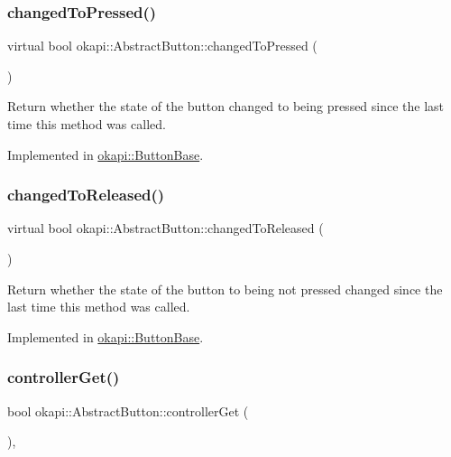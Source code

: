 \subsubsection{\texorpdfstring{changedToPressed()}{changedToPressed()}}
{\footnotesize\ttfamily virtual bool okapi\+::\+Abstract\+Button\+::changed\+To\+Pressed (\begin{DoxyParamCaption}{ }\end{DoxyParamCaption})\hspace{0.3cm}{\ttfamily [pure virtual]}}

Return whether the state of the button changed to being pressed since the last time this method was called. 

Implemented in \mbox{\hyperlink{classokapi_1_1ButtonBase_ac97e3d96db3d83f1638ad071e2dff856}{okapi\+::\+Button\+Base}}.

\mbox{\label{classokapi_1_1AbstractButton_ab4f7a216d6d0a9d14bb89705df0327b3}} 
\subsubsection{\texorpdfstring{changedToReleased()}{changedToReleased()}}
{\footnotesize\ttfamily virtual bool okapi\+::\+Abstract\+Button\+::changed\+To\+Released (\begin{DoxyParamCaption}{ }\end{DoxyParamCaption})\hspace{0.3cm}{\ttfamily [pure virtual]}}

Return whether the state of the button to being not pressed changed since the last time this method was called. 

Implemented in \mbox{\hyperlink{classokapi_1_1ButtonBase_a7916b659f61e8ef2b23aec879a65fbac}{okapi\+::\+Button\+Base}}.

\mbox{\label{classokapi_1_1AbstractButton_a4b8574ff797eb44fcd84d6831dc8a8a0}} 
\subsubsection{\texorpdfstring{controllerGet()}{controllerGet()}}
{\footnotesize\ttfamily bool okapi\+::\+Abstract\+Button\+::controller\+Get (\begin{DoxyParamCaption}{ }\end{DoxyParamCaption})\hspace{0.3cm}{\ttfamily [override]}, {\ttfamily [virtual]}}

